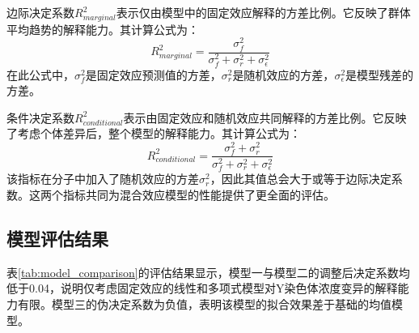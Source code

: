 边际决定系数$R^2_{marginal}$表示仅由模型中的固定效应解释的方差比例。它反映了群体平均趋势的解释能力。其计算公式为：
\begin{equation}
R^2_{marginal} = \frac{\sigma^2_f}{\sigma^2_f + \sigma^2_r + \sigma^2_{\epsilon}}
\end{equation}
在此公式中，$\sigma^2_f$是固定效应预测值的方差，$\sigma^2_r$是随机效应的方差，$\sigma^2_{\epsilon}$是模型残差的方差。

条件决定系数$R^2_{conditional}$表示由固定效应和随机效应共同解释的方差比例。它反映了考虑个体差异后，整个模型的解释能力。其计算公式为：
\begin{equation}
R^2_{conditional} = \frac{\sigma^2_f + \sigma^2_r}{\sigma^2_f + \sigma^2_r + \sigma^2_{\epsilon}}
\end{equation}
该指标在分子中加入了随机效应的方差$\sigma^2_r$，因此其值总会大于或等于边际决定系数。这两个指标共同为混合效应模型的性能提供了更全面的评估。

\subsection{模型评估结果}

\begin{table}[h!]
\centering
\caption{四种候选模型的评估指标对比}
\label{tab:model_comparison}
\end{table}

表\ref{tab:model_comparison}的评估结果显示，模型一与模型二的调整后决定系数均低于0.04，说明仅考虑固定效应的线性和多项式模型对Y染色体浓度变异的解释能力有限。模型三的伪决定系数为负值，表明该模型的拟合效果差于基础的均值模型。

